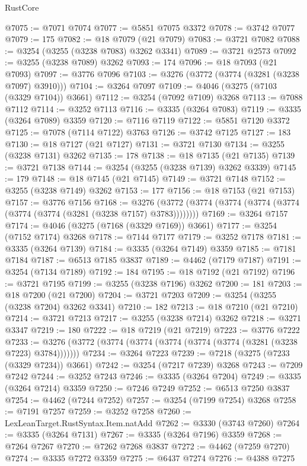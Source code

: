 \begin{lexlean}{RustCore}
\begin{coremodule}
@7075 := @7071 @7074
@7077 := @5851 @7075 @3372
@7078 := @3742 @7077
@7079 := 175
@7082 := @18 @7079 (@21 @7079)
@7083 := @3721 @7082
@7088 := @3254 (@3255 (@3238 @7083) @3262 @3341)
@7089 := @3721 @2573
@7092 := @3255 (@3238 @7089) @3262
@7093 := 174
@7096 := @18 @7093 (@21 @7093)
@7097 := @3776 @7096
@7103 := @3276 (@3772 (@3774 (@3281 (@3238 @7097) @3910)))
@7104 := @3264 @7097
@7109 := @4046 (@3275 (@7103 (@3329 @7104)) @3661)
@7112 := @3254 (@7092 @7109) @3268
@7113 := @7088 @7112
@7114 := @3252 @7113
@7116 := @3335 (@3264 @7083)
@7119 := @3335 (@3264 @7089) @3359
@7120 := @7116 @7119
@7122 := @5851 @7120 @3372
@7125 := @7078 (@7114 @7122) @3763
@7126 := @3742 @7125
@7127 := 183
@7130 := @18 @7127 (@21 @7127)
@7131 := @3721 @7130
@7134 := @3255 (@3238 @7131) @3262
@7135 := 178
@7138 := @18 @7135 (@21 @7135)
@7139 := @3721 @7138
@7144 := @3254 (@3255 (@3238 @7139) @3262 @3339)
@7145 := 179
@7148 := @18 @7145 (@21 @7145)
@7149 := @3721 @7148
@7152 := @3255 (@3238 @7149) @3262
@7153 := 177
@7156 := @18 @7153 (@21 @7153)
@7157 := @3776 @7156
@7168 := @3276 (@3772 (@3774 (@3774 (@3774 (@3774 (@3774 (@3774 (@3281 (@3238 @7157) @3783))))))))
@7169 := @3264 @7157
@7174 := @4046 (@3275 (@7168 (@3329 @7169)) @3661)
@7177 := @3254 (@7152 @7174) @3268
@7178 := @7144 @7177
@7179 := @3252 @7178
@7181 := @3335 (@3264 @7139)
@7184 := @3335 (@3264 @7149) @3359
@7185 := @7181 @7184
@7187 := @6513 @7185 @3837
@7189 := @4462 (@7179 @7187)
@7191 := @3254 (@7134 @7189)
@7192 := 184
@7195 := @18 @7192 (@21 @7192)
@7196 := @3721 @7195
@7199 := @3255 (@3238 @7196) @3262
@7200 := 181
@7203 := @18 @7200 (@21 @7200)
@7204 := @3721 @7203
@7209 := @3254 (@3255 (@3238 @7204) @3262 @3341)
@7210 := 182
@7213 := @18 @7210 (@21 @7210)
@7214 := @3721 @7213
@7217 := @3255 (@3238 @7214) @3262
@7218 := @3271 @3347
@7219 := 180
@7222 := @18 @7219 (@21 @7219)
@7223 := @3776 @7222
@7233 := @3276 (@3772 (@3774 (@3774 (@3774 (@3774 (@3774 (@3281 (@3238 @7223) @3784)))))))
@7234 := @3264 @7223
@7239 := @7218 (@3275 (@7233 (@3329 @7234)) @3661)
@7242 := @3254 (@7217 @7239) @3268
@7243 := @7209 @7242
@7244 := @3252 @7243
@7246 := @3335 (@3264 @7204)
@7249 := @3335 (@3264 @7214) @3359
@7250 := @7246 @7249
@7252 := @6513 @7250 @3837
@7254 := @4462 (@7244 @7252)
@7257 := @3254 (@7199 @7254) @3268
@7258 := @7191 @7257
@7259 := @3252 @7258
@7260 := LexLeanTarget.RustSyntax.Item.natAdd
@7262 := @3330 (@3743 @7260)
@7264 := @3335 (@3264 @7131)
@7267 := @3335 (@3264 @7196) @3359
@7268 := @7264 @7267
@7270 := @7262 @7268 @3837
@7272 := @4462 (@7259 @7270)
@7274 := @3335 @7272 @3359
@7275 := @6437 @7274
@7276 := @4388 @7275

\end{coremodule}
\end{lexlean}
